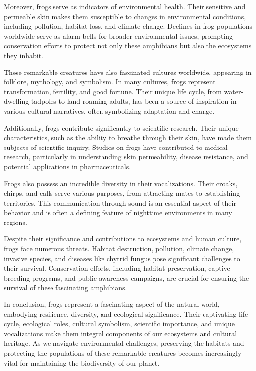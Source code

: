 \documentclass[twocolumn, 9pt]{extarticle}
\begin{document}
Moreover, frogs serve as indicators of environmental health. Their sensitive and permeable skin makes them susceptible to changes in environmental conditions, including pollution, habitat loss, and climate change. Declines in frog populations worldwide serve as alarm bells for broader environmental issues, prompting conservation efforts to protect not only these amphibians but also the ecosystems they inhabit.

These remarkable creatures have also fascinated cultures worldwide, appearing in folklore, mythology, and symbolism. In many cultures, frogs represent transformation, fertility, and good fortune. Their unique life cycle, from water-dwelling tadpoles to land-roaming adults, has been a source of inspiration in various cultural narratives, often symbolizing adaptation and change.

Additionally, frogs contribute significantly to scientific research. Their unique characteristics, such as the ability to breathe through their skin, have made them subjects of scientific inquiry. Studies on frogs have contributed to medical research, particularly in understanding skin permeability, disease resistance, and potential applications in pharmaceuticals.

Frogs also possess an incredible diversity in their vocalizations. Their croaks, chirps, and calls serve various purposes, from attracting mates to establishing territories. This communication through sound is an essential aspect of their behavior and is often a defining feature of nighttime environments in many regions.

Despite their significance and contributions to ecosystems and human culture, frogs face numerous threats. Habitat destruction, pollution, climate change, invasive species, and diseases like chytrid fungus pose significant challenges to their survival. Conservation efforts, including habitat preservation, captive breeding programs, and public awareness campaigns, are crucial for ensuring the survival of these fascinating amphibians.

In conclusion, frogs represent a fascinating aspect of the natural world, embodying resilience, diversity, and ecological significance. Their captivating life cycle, ecological roles, cultural symbolism, scientific importance, and unique vocalizations make them integral components of our ecosystems and cultural heritage. As we navigate environmental challenges, preserving the habitats and protecting the populations of these remarkable creatures becomes increasingly vital for maintaining the biodiversity of our planet.




\end{document}
